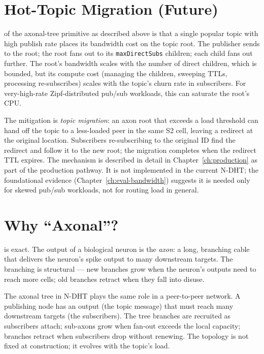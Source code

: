 \documentclass[twoside,nobib]{tufte-book}
\newcommand{\NDHT}{N-DHT\xspace}
\begin{document}
\section{Hot-Topic Migration (Future)}

 of the axonal-tree primitive as
described above is that a single popular topic with high publish
rate places its bandwidth cost on the topic root. The publisher
sends to the root; the root fans out to its
\texttt{maxDirectSubs} children; each child fans out further. The
root's bandwidth scales with the number of direct children, which
is bounded, but its compute cost (managing the children, sweeping
TTLs, processing re-subscribes) scales with the topic's churn rate
in subscribers. For very-high-rate Zipf-distributed pub/sub
workloads, this can saturate the root's CPU.

The mitigation is \emph{topic migration}: an axon root that
exceeds a load threshold can hand off the topic to a less-loaded
peer in the same S2 cell, leaving a redirect at the original
location. Subscribers re-subscribing to the original ID find the
redirect and follow it to the new root; the migration completes
when the redirect TTL expires. The mechanism is described in
detail in Chapter~\ref{ch:production} as part of the production
pathway. It is not implemented in the current \NDHT; the
foundational evidence (Chapter~\ref{ch:eval-bandwidth}) suggests
it is needed only for skewed pub/sub workloads, not for routing
load in general.

\section{Why ``Axonal''?}

 is exact. The output of a biological
neuron is the \emph{axon}: a long, branching cable that delivers
the neuron's spike output to many downstream targets. The branching
is structural --- new branches grow when the neuron's outputs need
to reach more cells; old branches retract when they fall into
disuse.

The axonal tree in \NDHT plays the same role in a peer-to-peer
network. A publishing node has an output (the topic message) that
must reach many downstream targets (the subscribers). The tree
branches are recruited as subscribers attach; sub-axons grow when
fan-out exceeds the local capacity; branches retract when
subscribers drop without renewing. The topology is not fixed at
construction; it evolves with the topic's load.
\end{document}
